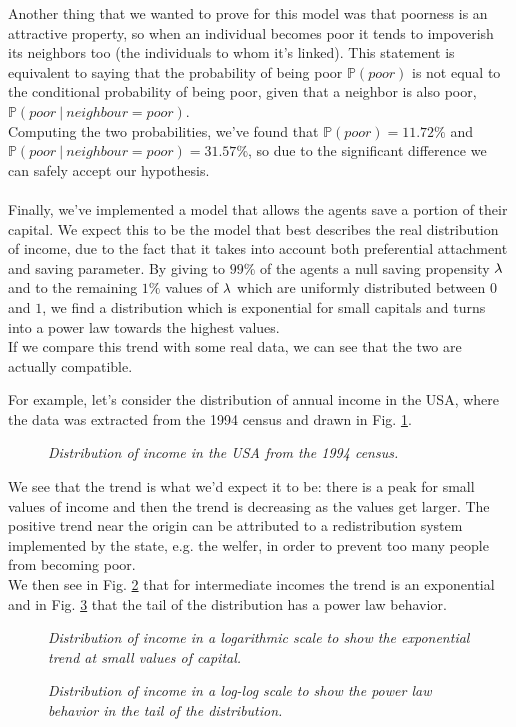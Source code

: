 Another thing that we wanted to prove for this model was that poorness is an attractive property, so when an individual becomes poor it tends to impoverish its neighbors too (the individuals to whom it's linked).
This statement is equivalent to saying that the probability of being poor $\mathbb{P}(poor)$ is not equal to the conditional probability of being poor, given that a neighbor is also poor, $\mathbb{P}(poor \ | \ neighbour=poor)$. \\
Computing the two probabilities, we've found that $\mathbb{P}(poor) = 11.72 \%$ and \\ $\mathbb{P}(poor \ | \ neighbour=poor) = 31.57 \%$, so due to the significant difference we can safely accept our hypothesis. \\ \\
Finally, we've implemented a model that allows the agents save a portion of their capital.
We expect this to be the model that best describes the real distribution of income, due to the fact that it takes into account both preferential attachment and saving parameter.
By giving to $99 \%$ of the agents a null saving propensity $\lambda$ and to the remaining $1 \%$ values of $\lambda$ which are uniformly distributed between $0$ and $1$, we find a distribution which is exponential for small capitals and turns into a power law towards the highest values. \\
If we compare this trend with some real data, we can see that the two are actually compatible.

For example, let's consider the distribution of annual income in the USA, where the data was extracted from the 1994 census and drawn in Fig. \ref{fig:gloabl_realData}.
\begin{figure}[ht!]
    \centering
    \scalebox{.7}{}
    \caption{\emph{Distribution of income in the USA from the 1994 census.}}
    \label{fig:gloabl_realData}
\end{figure}
We see that the trend is what we'd expect it to be: there is a peak for small values of income and then the trend is decreasing as the values get larger.
The positive trend near the origin can be attributed to a redistribution system implemented by the state, e.g. the welfer, in order to prevent too many people from becoming poor. \\
We then see in Fig. \ref{fig:real_head} that for intermediate incomes the trend is an exponential and in Fig. \ref{fig:real_tail} that the tail of the distribution has a power law behavior.
\begin{figure}[ht!]
    \centering
    \scalebox{.7}{}
    \caption{\emph{Distribution of income in a logarithmic scale to show the exponential trend at small values of capital.}}
    \label{fig:real_head}
\end{figure}
\begin{figure}[ht!]
    \centering
    \scalebox{.7}{}
    \caption{\emph{Distribution of income in a log-log scale to show the power law behavior in the tail of the distribution.}}
    \label{fig:real_tail}
\end{figure}
